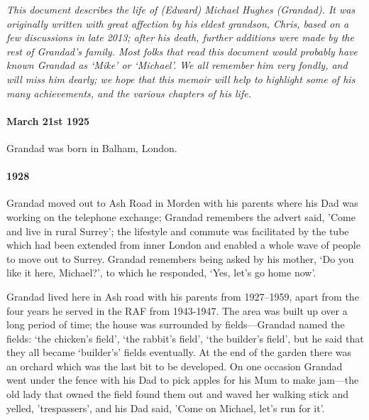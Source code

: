 %
{\itshape This document describes the life of (Edward) Michael Hughes (Grandad). It was
	originally written with great affection by his eldest grandson, Chris, based on a few discussions in late 2013; after
	his death, further additions were made by the rest of Grandad's family. Most folks that read this
	document would probably have known Grandad as `Mike' or `Michael'. We all remember him very fondly, and will
	miss him dearly; we hope that this memoir will help to highlight some of his many achievements, and the
various chapters of his life.}

\paragraph{March 21st 1925} Grandad was born in Balham, London.
\paragraph{1928} Grandad moved out to Ash Road in Morden with his parents where his Dad was working on the telephone exchange;
Grandad remembers the advert said, 'Come and live in rural Surrey'; the lifestyle and commute was facilitated
by the tube which had been extended from inner London and enabled a whole
wave of people to move out to Surrey. Grandad remembers being asked by
his mother, `Do you like it here, Michael?', to which he responded, `Yes, let's go home now'.

Grandad lived here in Ash road with his parents from 1927--1959, apart from the four years he served
in the RAF from 1943-1947.  The area was built up over a long period of time;
the house was surrounded by fields---Grandad named the fields: `the chicken's field',
`the rabbit's field', `the builder's field', but he said that they all became `builder's'
fields eventually. At the end of the garden there
was an orchard which was the last bit to be developed. On one occasion Grandad went under the
fence with his Dad to pick apples for his Mum to make jam---the old lady that owned the field
found them out and waved her walking stick and yelled, 'trespassers', and his
Dad said, 'Come on Michael, let's run for it'.

